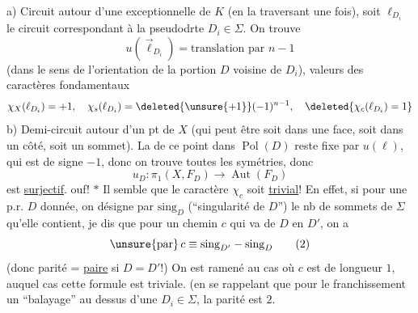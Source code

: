  a)  Circuit autour d'une   exceptionnelle de $K$ (en la traversant une fois), soit $\ell_{D_i}$ le circuit correspondant à la pseudodrte $D_i\in\Sigma$. On trouve
\[u(\vec\ell_{D_i})=\text{translation par }n-1\]
(dans le sens de l'orientation de la portion  $D$ voisine de $D_i$), valeurs des caractères fondamentaux
\[\chi_X(\ell_{D_i})=+1,\quad\chi_s(\ell_{D_i})=\deleted{\unsure{+1}}(-1)^{n-1},\quad\deleted{\chi_c(\ell_{D_i})=1}\]
b) Demi-circuit autour d'un pt de $X$ (qui peut être soit dans une face, soit dans un côté, soit  un sommet). La   de ce point dans $\operatorname{Pol}(D)$ reste fixe par $u(\ell)$, qui est de signe $-1$, donc on trouve toutes les symétries, donc
\[u_D:\pi_1(X,F_D)\longrightarrow\operatorname{Aut}(F_D)\]
est \uline{surjectif}. ouf!
$*$ Il semble que le caractère $\chi_c$ soit \uline{trivial}! En effet, si pour une p.r. $D$ donnée, on désigne par $\mathrm{sing}_D$ (``singularité de $D$'') le nb de sommets de $\Sigma$ qu'elle contient, je dis que pour un chemin $c$ qui va de $D$ en $D'$, on a
\[\unsure{\mathrm{par}}\,c\equiv\mathrm{sing}_{D'}-\mathrm{sing}_D\qquad(2)\]
(donc parité = \uline{paire} si $D=D'$!)
On est ramené au cas où $c$ est de longueur $1$, auquel cas cette formule est triviale. (en se rappelant que pour le franchissement  un ``balayage'' au dessus d'une  $D_i\in\Sigma$, la parité est $2$.

